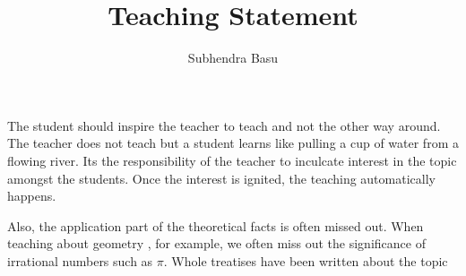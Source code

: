 \documentclass{article}
\title{Teaching Statement}
\author{Subhendra Basu}
\begin{document}
\maketitle

The student should inspire the teacher to teach and not the other way around.
The teacher does not teach but a student learns like pulling a cup of water from 
a flowing river.
Its the responsibility of the teacher to inculcate interest in the topic amongst the students.
Once the interest is ignited, the teaching automatically happens.

Also, the application part of the theoretical facts is often missed out.
When teaching about geometry , for example, we often miss out the significance of irrational
numbers such as $\pi$. Whole treatises have been written about the topic
\end{document}
